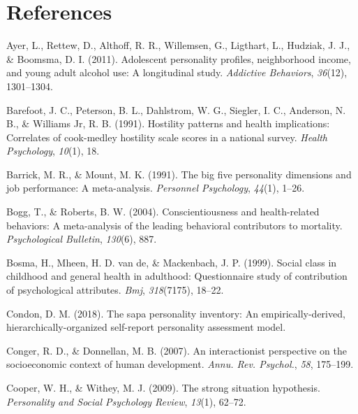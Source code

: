 \documentclass[man]{apa6}
\begin{document}
\newpage

\hypertarget{references}{%
\section{References}\label{references}}

\begingroup
\setlength{\parindent}{-0.5in}
\setlength{\leftskip}{0.5in}

\hypertarget{refs}{}
\leavevmode\hypertarget{ref-ayer2011adolescent}{}%
Ayer, L., Rettew, D., Althoff, R. R., Willemsen, G., Ligthart, L., Hudziak, J. J., \& Boomsma, D. I. (2011). Adolescent personality profiles, neighborhood income, and young adult alcohol use: A longitudinal study. \emph{Addictive Behaviors}, \emph{36}(12), 1301--1304.

\leavevmode\hypertarget{ref-barefoot1991hostility}{}%
Barefoot, J. C., Peterson, B. L., Dahlstrom, W. G., Siegler, I. C., Anderson, N. B., \& Williams Jr, R. B. (1991). Hostility patterns and health implications: Correlates of cook-medley hostility scale scores in a national survey. \emph{Health Psychology}, \emph{10}(1), 18.

\leavevmode\hypertarget{ref-barrick1991big}{}%
Barrick, M. R., \& Mount, M. K. (1991). The big five personality dimensions and job performance: A meta-analysis. \emph{Personnel Psychology}, \emph{44}(1), 1--26.

\leavevmode\hypertarget{ref-bogg2004conscientiousness}{}%
Bogg, T., \& Roberts, B. W. (2004). Conscientiousness and health-related behaviors: A meta-analysis of the leading behavioral contributors to mortality. \emph{Psychological Bulletin}, \emph{130}(6), 887.

\leavevmode\hypertarget{ref-bosma1999social}{}%
Bosma, H., Mheen, H. D. van de, \& Mackenbach, J. P. (1999). Social class in childhood and general health in adulthood: Questionnaire study of contribution of psychological attributes. \emph{Bmj}, \emph{318}(7175), 18--22.

\leavevmode\hypertarget{ref-condon2018sapa}{}%
Condon, D. M. (2018). The sapa personality inventory: An empirically-derived, hierarchically-organized self-report personality assessment model.

\leavevmode\hypertarget{ref-conger2007interactionist}{}%
Conger, R. D., \& Donnellan, M. B. (2007). An interactionist perspective on the socioeconomic context of human development. \emph{Annu. Rev. Psychol.}, \emph{58}, 175--199.

\leavevmode\hypertarget{ref-cooper2009strong}{}%
Cooper, W. H., \& Withey, M. J. (2009). The strong situation hypothesis. \emph{Personality and Social Psychology Review}, \emph{13}(1), 62--72.
\end{document}
